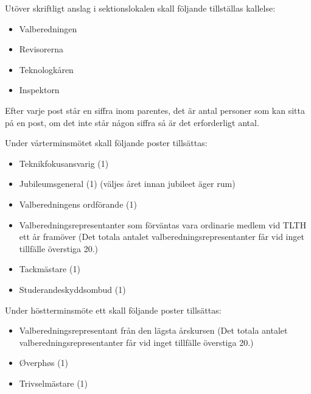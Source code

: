 \documentclass[pdfbookmarks,a4paper,11pt]{article}
\newlength{\itemcollength}
\newenvironment{reglemlista}{%
  \begin{list}{}{%
      \setlength{\labelwidth}{\itemcollength}%
      \setlength{\leftmargin}{\labelwidth + \labelsep}%
      \renewcommand{\makelabel}[1]{%
        \raisebox{0pt}[1ex][0pt]{%
          \makebox[\labelwidth][l]{%
            \parbox[t]{\itemcollength}{%
              \raggedright\hspace{0pt}##1}}}\hfill}%
      }}{%
  \end{list}}
\begin{document}
\begin{reglemlista}

	\item[Utlysande]
	Utöver skriftligt anslag i sektionslokalen skall följande tillställas kallelse:
	\begin{itemize}
		\item Valberedningen
		\item Revisorerna
		\item Teknologkåren
		\item Inspektorn
	\end{itemize}
	
	\item[Förtydligande]
	Efter varje post står en siffra inom parentes, det är antal personer som kan sitta på en post, om det inte står någon siffra så är det erforderligt antal.

	\item[Vårterminsmöte]
	Under vårterminsmötet skall följande poster tillsättas:
	\begin{itemize}

		\item Teknikfokusansvarig (1)
		\item Jubileumsgeneral (1) (väljes året innan jubileet äger rum)
		\item Valberedningens ordförande (1)
		\item  Valberedningsrepresentanter som förväntas vara ordinarie medlem vid TLTH ett år framöver (Det totala antalet valberedningsrepresentanter får vid inget tillfälle överstiga 20.)
		\item Tackmästare (1)
		\item Studerandeskyddsombud (1)
	\end{itemize}

	\item[Höstterminsmöte ett]
	Under höstterminsmöte ett skall följande poster tillsättas:
	\begin{itemize}
		\item Valberedningsrepresentant från den lägsta årskursen (Det totala
antalet valberedningsrepresentanter får vid inget tillfälle överstiga
20.)
		\item Øverphøs (1)
		\item Trivselmästare (1)
	\end{itemize}


\end{reglemlista}
\end{document}
